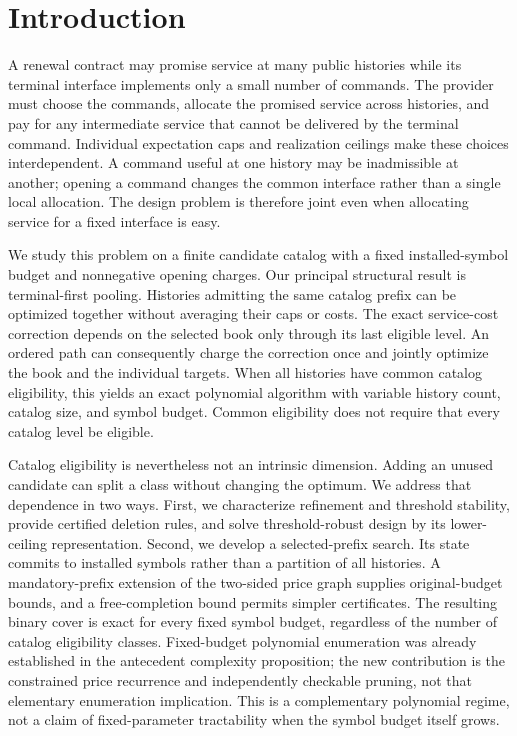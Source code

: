 \section{Introduction}
A renewal contract may promise service at many public histories while its terminal interface implements only a small number of commands. The provider must choose the commands, allocate the promised service across histories, and pay for any intermediate service that cannot be delivered by the terminal command. Individual expectation caps and realization ceilings make these choices interdependent. A command useful at one history may be inadmissible at another; opening a command changes the common interface rather than a single local allocation. The design problem is therefore joint even when allocating service for a fixed interface is easy.

We study this problem on a finite candidate catalog with a fixed installed-symbol budget and nonnegative opening charges. Our principal structural result is terminal-first pooling. Histories admitting the same catalog prefix can be optimized together without averaging their caps or costs. The exact service-cost correction depends on the selected book only through its last eligible level. An ordered path can consequently charge the correction once and jointly optimize the book and the individual targets. When all histories have common catalog eligibility, this yields an exact polynomial algorithm with variable history count, catalog size, and symbol budget. Common eligibility does not require that every catalog level be eligible.

Catalog eligibility is nevertheless not an intrinsic dimension. Adding an unused candidate can split a class without changing the optimum. We address that dependence in two ways. First, we characterize refinement and threshold stability, provide certified deletion rules, and solve threshold-robust design by its lower-ceiling representation. Second, we develop a selected-prefix search. Its state commits to installed symbols rather than a partition of all histories. A mandatory-prefix extension of the two-sided price graph supplies original-budget bounds, and a free-completion bound permits simpler certificates. The resulting binary cover is exact for every fixed symbol budget, regardless of the number of catalog eligibility classes. Fixed-budget polynomial enumeration was already established in the antecedent complexity proposition; the new contribution is the constrained price recurrence and independently checkable pruning, not that elementary enumeration implication. This is a complementary polynomial regime, not a claim of fixed-parameter tractability when the symbol budget itself grows.

